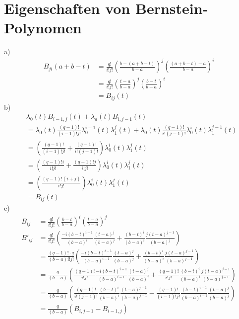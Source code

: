 \section{Eigenschaften von Bernstein-Polynomen}
a)
\begin{align}
	B_{ji}(a+b-t) &= \frac{q!}{i!j!} \left(\frac{b-(a+b-t)}{b-a}\right)^j \left(\frac{(a+b-t)-a}{b-a}\right)^i \\
	&= \frac{q!}{i!j!} \left(\frac{t-a}{b-a}\right)^j \left(\frac{b-t}{b-a}\right)^i\\
	&= B_{ij}(t)
\end{align}
b)
\begin{align}
	& \lambda_0(t) B_{i-1,j}(t) + \lambda_a(t) B_{i,j-1}(t)\\
	&= \lambda_0(t) \frac{(q-1)!}{(i-1)!j!} \lambda_0^{i-1}(t) \lambda_1^{j}(t) + \lambda_0(t) \frac{(q-1)!}{i!(j-1)!} \lambda_0^{i}(t) \lambda_1^{j-1}(t)\\
	&= \left(\frac{(q-1)!}{(i-1)!j!} +\frac{(q-1)!}{i!(j-1)!} \right) \lambda_0^i(t)\lambda_1^{j}(t) \\
	&= \left(\frac{(q-1)!i}{i!j!} +\frac{(q-1)!j}{i!j!} \right)  \lambda_0^i(t)\lambda_1^{j}(t)\\
	&= \left(\frac{(q-1)!(i+j)}{i!j!} \right) \lambda_0^i(t)\lambda_1^{j}(t)\\
	&= B_{ij}(t)
\end{align}
c)
\begin{align}
	B_{ij} &= \frac{q!}{i!j!} \left(\frac{b-t}{b-a}\right)^i \left(\frac{t-a}{b-a}\right)^j \\
	B'_{ij} &= \frac{q!}{i!j!} \left(\frac{-i(b-t)^{i-1}}{(b-a)^i} \frac{(t-a)^{j}}{(b-a)^j} + \frac{(b-t)^{i}}{(b-a)^i} \frac{j(t-a)^{j-1}}{(b-a)^j} \right)\\
	&= \frac{(q-1)!\cdot q}{(b-a) i! j!} \left(\frac{-i(b-t)^{i-1}}{(b-a)^{i-1}} \frac{(t-a)^{j}}{(b-a)^j} + \frac{(b-t)^{i}}{(b-a)^i} \frac{j(t-a)^{j-1}}{(b-a)^{j-1}} \right)\\
	&= \frac{q}{(b-a)} \left(\frac{(q-1)!}{i!j!}\frac{-i(b-t)^{i-1}}{(b-a)^{i-1}} \frac{(t-a)^{j}}{(b-a)^j} + \frac{(q-1)!}{i!j!}\frac{(b-t)^{i}}{(b-a)^i} \frac{j(t-a)^{j-1}}{(b-a)^{j-1}} \right)\\
	&= \frac{q}{(b-a)} \left(\frac{(q-1)!}{i!(j-1)!}\frac{(b-t)^{i}}{(b-a)^i} \frac{(t-a)^{j-1}}{(b-a)^{j-1}} - \frac{(q-1)!}{(i-1)!j!}\frac{(b-t)^{i-1}}{(b-a)^{i-1}} \frac{(t-a)^{j}}{(b-a)^j}\right)\\
	&= \frac{q}{(b-a)} \left( B_{i,j-1} - B_{i-1,j} \right) 
\end{align}
